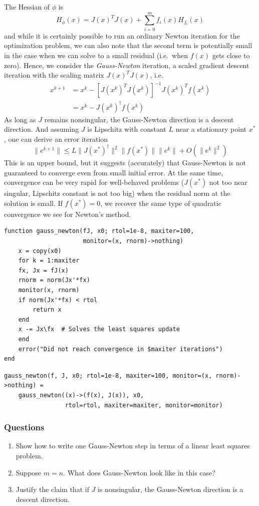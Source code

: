 \documentclass[12pt, leqno]{article} %
\providecommand{\tightlist}{%
  \setlength{\itemsep}{0pt}\setlength{\parskip}{0pt}}
\begin{document}
The Hessian of \(\phi\) is
\[H_{\phi}(x) = J(x)^T J(x) + \sum_{i=0}^m f_i(x) H_{f_i}(x)\] and while
it is certainly possible to run an ordinary Newton iteration for the
optimization problem, we can also note that the second term is
potentially small in the case when we can solve to a small residual
(i.e.~when \(f(x)\) gets close to zero). Hence, we consider the
\emph{Gauss-Newton} iteration, a scaled gradient descent iteration with
the scaling matrix \(J(x)^T J(x)\), i.e. \begin{align*}
  x^{k+1}
  &= x^k - \left[ J(x^k)^T J(x^k) \right]^{-1} J(x^k)^T f(x^k) \\
  &= x^k - J(x^k)^\dagger f(x^k)
\end{align*} As long as \(J\) remains nonsingular, the Gauss-Newton
direction is a descent direction. And assuming \(J\) is Lipschitz with
constant \(L\) near a stationary point \(x^*\), one can derive an error
iteration
\[\|e^{k+1}\| \leq L \|J(x^*)^\dagger\|^2 \|f(x^*)\| \|e^k\| + O(\|e^k\|^2)\]
This is an upper bound, but it suggests (accurately) that Gauss-Newton
is not guaranteed to converge even from small initial error. At the same
time, convergence can be very rapid for well-behaved problems
(\(J(x^*)\) not too near singular, Lipschitz constant is not too big)
when the residual norm at the solution is small. If \(f(x^*) = 0\), we
recover the same type of quadratic convergence we see for Newton's
method.

\begin{verbatim}
function gauss_newton(fJ, x0; rtol=1e-8, maxiter=100,
                      monitor=(x, rnorm)->nothing)
    x = copy(x0)
    for k = 1:maxiter
	fx, Jx = fJ(x)
	rnorm = norm(Jx'*fx)
	monitor(x, rnorm)
	if norm(Jx'*fx) < rtol
	    return x
	end
	x -= Jx\fx  # Solves the least squares update
    end
    error("Did not reach convergence in $maxiter iterations")
end
\end{verbatim}

\begin{verbatim}
gauss_newton(f, J, x0; rtol=1e-8, maxiter=100, monitor=(x, rnorm)->nothing) =
    gauss_newton((x)->(f(x), J(x)), x0,
                 rtol=rtol, maxiter=maxiter, monitor=monitor)
\end{verbatim}

\subsubsection{Questions}

\begin{enumerate}
\def\labelenumi{\arabic{enumi}.}
\tightlist
\item
  Show how to write one Gauss-Newton step in terms of a linear least
  squares problem.
\item
  Suppose \(m = n\). What does Gauss-Newton look like in this case?
\item
  Justify the claim that if \(J\) is nonsingular, the Gauss-Newton
  direction is a descent direction.
\end{enumerate}
\end{document}
